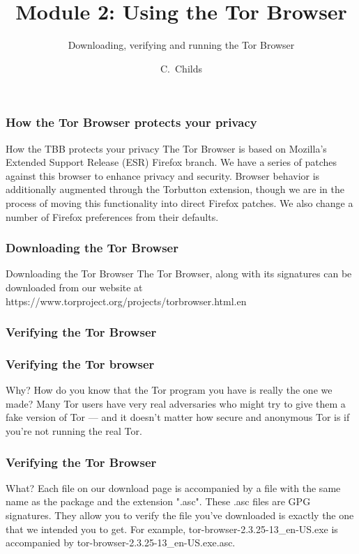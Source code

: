 \documentclass{beamer}
\title[Module 2: Tor Browser]
{Module 2: Using the Tor Browser}
\subtitle{Downloading, verifying and running the Tor Browser}
\author[C. Childs]
{C.~Childs\inst{1}}
\institute[Tor Project]
{
  \inst{1}
  Support assistant / Translation coordinator\\
  The Tor Project
}
\begin{document}
\frame{\titlepage}

\begin{frame}
\frametitle{How the Tor Browser protects your privacy}
	\begin{block}{How the TBB protects your privacy}
The Tor Browser is based on Mozilla's Extended Support Release (ESR) Firefox branch. We have a series of patches against this browser to enhance privacy and security. Browser behavior is additionally augmented through the Torbutton extension, though we are in the process of moving this functionality into direct Firefox patches. We also change a number of Firefox preferences from their defaults.
	\end{block}
\end{frame}

\begin{frame}
\frametitle{Downloading the Tor Browser}
        \begin{block}{Downloading the Tor Browser}
The Tor Browser, along with its signatures can be downloaded from our website at https://www.torproject.org/projects/torbrowser.html.en
        \end{block}
\end{frame}

\begin{frame}
\frametitle{Verifying the Tor Browser}
\end{frame}

\begin{frame}
\frametitle{Verifying the Tor browser}
        \begin{block}{Why?}
How do you know that the Tor program you have is really the one we made? Many Tor users have very real adversaries who might try to give them a fake version of Tor — and it doesn't matter how secure and anonymous Tor is if you're not running the real Tor.
	\end{block}
\end{frame}

\begin{frame}
\frametitle{Verifying the Tor Browser}
        \begin{block}{What?}
Each file on our download page is accompanied by a file with the same name as the package and the extension ".asc". These .asc files are GPG signatures. They allow you to verify the file you've downloaded is exactly the one that we intended you to get. For example, tor-browser-2.3.25-13\_en-US.exe is accompanied by tor-browser-2.3.25-13\_en-US.exe.asc.
        \end{block}
\end{frame}
\end{document}
